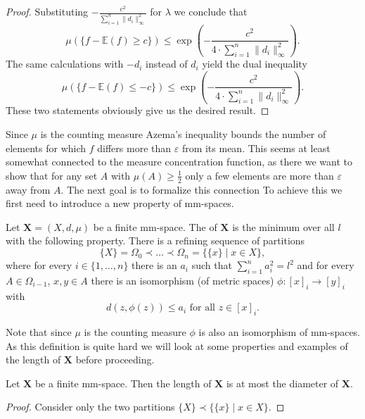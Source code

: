 \begin{proof}
Substituting $-\frac{c^2}{\sum_{i=1}^{n}\|d_i\|_\infty^2}$ for $\lambda$ we conclude that
\[\mu(\{f-\mathbb{E}(f)\geq c\})\leq\exp\left(-\frac{c^2}{4\cdot\sum_{i=1}^{n}\|d_i\|^2_\infty}\right). \]
The same calculations with $-d_i$ instead of $d_i$ yield the dual inequality
\[\mu(\{f-\mathbb{E}(f)\leq -c\})\leq\exp\left(-\frac{c^2}{4\cdot\sum_{i=1}^{n}\|d_i\|^2_\infty}\right). \]
These two statements obviously give us the desired result.
\end{proof}

Since $\mu$ is the counting measure Azema's inequality bounds the number of elements for which $f$ differs more than $\varepsilon$ from its mean. This seems at least somewhat connected to the measure concentration function, as there we want to show that for any set $A$ with $\mu(A)\geq\frac{1}{2}$ only a few elements are more than $\varepsilon$ away from $A$.
The next goal is to formalize this connection %
To achieve this we first need to introduce a new property of mm-spaces.
\begin{definition}\label{def:length}
Let $\boldsymbol{X}=(X,d,\mu)$ be a finite mm-space. The  of $\boldsymbol X$ is the minimum over all $l$ with the following property. There is a refining sequence of partitions 
\[\{X\}=\Omega_0\prec\dots\prec\Omega_n=\{\{x\}\mid x\in X\},\]
where for every $i\in\{1,\dots,n\}$ there is an $a_i$ such that $\sum_{i=1}^{n}a^2_i=l^2$ and for every $A\in \Omega_{i-1}$, $x,y\in A$ there is an isomorphism (of metric spaces) $\phi\colon[x]_i\to [y]_i$ with 
\[d(z,\phi(z))\leq a_i\text{ for all $z\in[x]_i$.}\]
\end{definition}

Note that since $\mu$ is the counting measure $\phi$ is also an isomorphism of mm-spaces.
As this definition is quite hard we will look at some properties and examples of the length of $\boldsymbol{X}$ before proceeding.
\begin{lemma}
Let $\boldsymbol{X}$ be a finite mm-space. Then the length of $\boldsymbol{X}$ is at most the diameter of $\boldsymbol{X}$.
\end{lemma}
\begin{proof}
Consider only the two partitions $\{X\}\prec\{\{x\}\mid x\in X\}$.
\end{proof}


